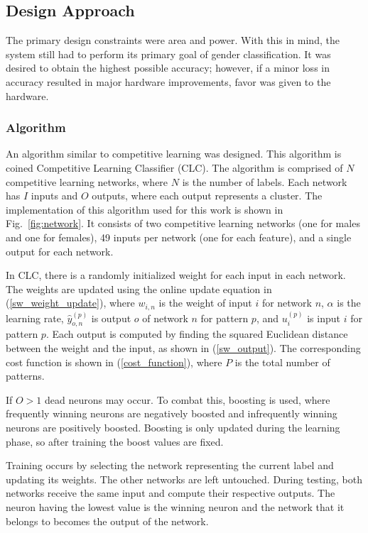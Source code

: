\documentclass[10pt,journal]{IEEEtran}
\newcommand{\fig}[1]{Fig.~\ref{#1}}
\newcommand{\eq}[1]{(\ref{#1})}
\begin{document}
	\subsection{Design Approach}
		The primary design constraints were area and power. With this in mind, the system still had to perform its primary goal of gender classification. It was desired to obtain the highest possible accuracy; however, if a minor loss in accuracy resulted in major hardware improvements, favor was given to the hardware.
		
		\subsubsection{Algorithm}
			An algorithm similar to competitive learning was designed. This algorithm is coined Competitive Learning Classifier (CLC). The algorithm is comprised of \(N\) competitive learning networks, where \(N\) is the number of labels. Each network has \(I\) inputs and \(O\) outputs, where each output represents a cluster. The implementation of this algorithm used for this work is shown in \fig{fig:network}. It consists of two competitive learning networks (one for males and one for females), 49 inputs per network (one for each feature), and a single output for each network.
			
			In CLC, there is a randomly initialized weight for each input in each network. The weights are updated using the online update equation in \eq{sw_weight_update}, where \(w_{i,n}\) is the weight of input \(i\) for network \(n\), \(\alpha\) is the learning rate, \(\hat{y}_{o,n}^{(p)}\) is output \(o\) of network \(n\) for pattern \(p\), and \(u_i^{(p)}\) is input \(i\) for pattern \(p\). Each output is computed by finding the squared Euclidean distance between the weight and the input, as shown in \eq{sw_output}. The corresponding cost function is shown in \eq{cost_function}, where \(P\) is the total number of patterns.
			
			If \(O>1\) dead neurons may occur. To combat this, boosting is used, where frequently winning neurons are negatively boosted and infrequently winning neurons are positively boosted. Boosting is only updated during the learning phase, so after training the boost values are fixed.
			
			Training occurs by selecting the network representing the current label and updating its weights. The other networks are left untouched. During testing, both networks receive the same input and compute their respective outputs. The neuron having the lowest value is the winning neuron and the network that it belongs to becomes the output of the network.
			
\end{document}
